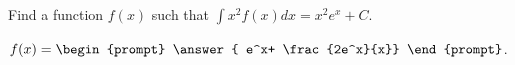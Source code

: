 \documentclass{ximera}
\author{Jim Talamo}
\begin{document}
\begin{exercise}
Find a function $f(x)$ such that $\int x^2 f(x) dx = x^2 e^x +C$. 

$f(x) = \begin{prompt} \answer{ e^x+ \frac{2e^x}{x}} \end{prompt}$.


\end{exercise}
\end{document}
